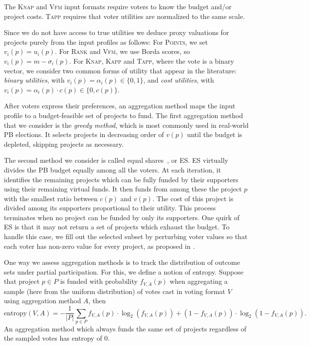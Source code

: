 \documentclass[twoside,11pt]{article}
\newcommand{\kibitz}[2]{\ifnum\Comments=1{\color{#1}{#2}}\fi}
\newcommand{\gb}[1]{\kibitz{red}{[GB:#1]}}
\newcommand{\points}{\textsc{Points}}
\newcommand{\rank}{\textsc{Rank}}
\newcommand{\vfm}{\textsc{Vfm}}
\newcommand{\knap}{\textsc{Knap}}
\newcommand{\kapp}{\textsc{Kapp}}
\newcommand{\tapp}{\textsc{Tapp}}
\newcommand{\mes}{ES}
\begin{document}
The \knap{} and \vfm{} input formats require voters to know the budget and/or project costs.   \tapp{}  requires that voter utilities are normalized to the same scale.   
 
 Since we do not have access to true utilities  we deduce proxy valuations for projects  purely from the input profiles as follows:
For \points{}, we set $v_i(p) = u_i(p).$ 
 For \rank{} and \vfm{}, we use Borda scores, so $v_i(p) = m - \sigma_i(p)$. 
 For \knap{}, \kapp{} and \tapp{}, where the vote is a binary vector, we consider two common forms of utility that appear in the literature: \emph{binary utilities}, with $v_i(p) = \alpha_i(p) \in \{0,1\}$, and \emph{cost utilities}, with $v_i(p) = \alpha_i(p)\cdot c(p) \in \{0,c(p)\}$. 

 \gb{todo: welfare, greedy, representtaion responsiveness, etc. }
 

After voters express their preferences, an aggregation method maps the input profile to a budget-feasible set of projects to fund. 
The first aggregation method that we consider is the \emph{greedy method}, which is most commonly used in real-world PB elections. 
 It selects projects in  decreasing order 
of $v(p)$ until the budget is depleted, skipping projects as necessary. 


 The  second method we consider is called equal shares~\cite{PS20}, %
 or \mes{}.  
\mes{} virtually  divides the PB budget equally among all the voters. 
At each iteration, it identifies the remaining projects which can be fully funded by their supporters using their remaining virtual funds.
It then funds from among these the  project $p$ with the smallest ratio between $c(p)$ and $v(p)$. 
The cost of this project is divided among its supporters proportional to their utility. 
This process terminates when no project can be funded by only its supporters. 
One quirk of \mes{} is that it may not return a set of projects which exhaust the budget. To handle this case, we fill out the selected subset by perturbing voter values so that each voter has non-zero value for every project, as proposed in  . 

One way we assess aggregation methods is to track the distribution of outcome sets under partial participation. For this, we define a notion of entropy. 
Suppose that project $p\in P$ is funded with probability $f_{V,A}(p)$ when aggregating  a sample (here from the uniform distribution) of votes cast in voting format $V$ using aggregation method $A$, then 
\[
\text{entropy}(V,A) = -\frac{1}{|P|}\sum_{p\in P} f_{V,A}(p) \cdot \log_2(f_{V,A}(p)) + (1 - f_{V,A}(p)) \cdot \log_2(1 - f_{V,A}(p)).
\]
An aggregation method which always funds the same set of projects regardless of the sampled votes has entropy of 0. 
 
\end{document}
